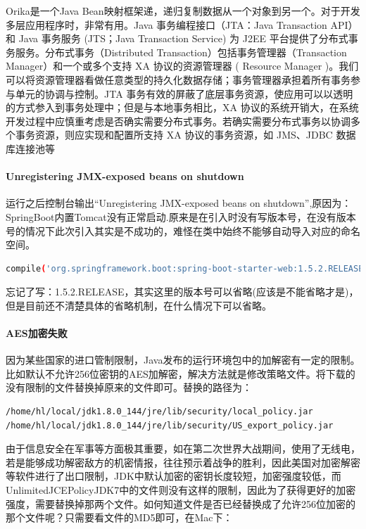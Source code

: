 \documentclass[letter]{book}
\begin{document}
Orika是一个Java Bean映射框架递，递归复制数据从一个对象到另一个。对于开发多层应用程序时，非常有用。Java 事务编程接口（JTA：Java Transaction API）和 Java 事务服务 (JTS；Java Transaction Service) 为 J2EE 平台提供了分布式事务服务。分布式事务（Distributed Transaction）包括事务管理器（Transaction Manager）和一个或多个支持 XA 协议的资源管理器 ( Resource Manager )。我们可以将资源管理器看做任意类型的持久化数据存储；事务管理器承担着所有事务参与单元的协调与控制。JTA 事务有效的屏蔽了底层事务资源，使应用可以以透明的方式参入到事务处理中；但是与本地事务相比，XA 协议的系统开销大，在系统开发过程中应慎重考虑是否确实需要分布式事务。若确实需要分布式事务以协调多个事务资源，则应实现和配置所支持 XA 协议的事务资源，如 JMS、JDBC 数据库连接池等

\paragraph{Unregistering JMX-exposed beans on shutdown}

运行之后控制台输出“Unregistering JMX-exposed beans on shutdown”,原因为：SpringBoot内置Tomcat没有正常启动.原来是在引入时没有写版本号，在没有版本号的情况下此次引入其实是不成功的，难怪在类中始终不能够自动导入对应的命名空间。

\begin{lstlisting}[language=Bash]
compile('org.springframework.boot:spring-boot-starter-web:1.5.2.RELEASE')
\end{lstlisting}

忘记了写：1.5.2.RELEASE，其实这里的版本号可以省略(应该是不能省略才是)，但是目前还不清楚具体的省略机制，在什么情况下可以省略。

\paragraph{AES加密失败}

因为某些国家的进口管制限制，Java发布的运行环境包中的加解密有一定的限制。比如默认不允许256位密钥的AES加解密，解决方法就是修改策略文件。将下载的没有限制的文件替换掉原来的文件即可。替换的路径为：

\begin{lstlisting}[language=Bash]
/home/hl/local/jdk1.8.0_144/jre/lib/security/local_policy.jar
/home/hl/local/jdk1.8.0_144/jre/lib/security/US_export_policy.jar
\end{lstlisting}

由于信息安全在军事等方面极其重要，如在第二次世界大战期间，使用了无线电，若是能够成功解密敌方的机密情报，往往预示着战争的胜利，因此美国对加密解密等软件进行了出口限制，JDK中默认加密的密钥长度较短，加密强度较低，而UnlimitedJCEPolicyJDK7中的文件则没有这样的限制，因此为了获得更好的加密强度，需要替换掉那两个文件。如何知道文件是否已经替换成了允许256位加密的那个文件呢？只需要看文件的MD5即可，在Mac下：
\end{document}
